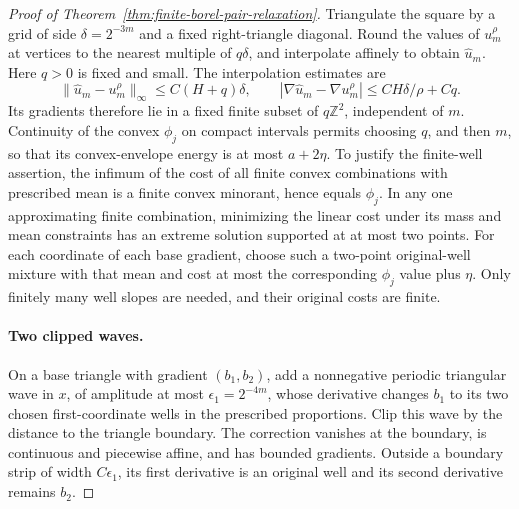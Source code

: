 \documentclass[11pt]{article}
\numberwithin{equation}{section}
\begin{document}
\begin{proof}[Proof of Theorem~\ref{thm:finite-borel-pair-relaxation}]
Triangulate the square by a grid of side $\delta=2^{-3m}$ and a
fixed right-triangle diagonal. Round the values of $u_m^\rho$ at
vertices to the nearest multiple of $q\delta$, and interpolate
affinely to obtain $\widehat u_m$. Here $q>0$ is fixed and small.
The interpolation estimates are
\[
 \|\widehat u_m-u_m^\rho\|_\infty\le C(H+q)\delta,
 \qquad
 |\nabla\widehat u_m-\nabla u_m^\rho|
                  \le CH\delta/\rho+Cq.
\]
Its gradients therefore lie in a fixed finite subset of
$q\mathbb Z^2$, independent of $m$. Continuity of the convex
$\phi_j$ on compact intervals permits choosing $q$, and then $m$,
so that its convex-envelope energy is at most $a+2\eta$.
To justify the finite-well assertion, the infimum of the cost of all
finite convex combinations with prescribed mean is a finite convex
minorant, hence equals $\phi_j$. In any one approximating finite
combination, minimizing the linear cost under its mass and mean
constraints has an extreme solution supported at at most two points.
For each coordinate of each base gradient, choose such a two-point
original-well mixture with that mean and cost at most the
corresponding $\phi_j$ value plus $\eta$. Only finitely many well
slopes are needed, and their original costs are finite.

\paragraph{Two clipped waves.}
On a base triangle with gradient $(b_1,b_2)$, add a nonnegative
periodic triangular wave in $x$, of amplitude at most
$\epsilon_1=2^{-4m}$, whose derivative changes $b_1$ to its two
chosen first-coordinate wells in the prescribed proportions.
Clip this wave by the distance to the triangle boundary. The
correction vanishes at the boundary, is continuous and piecewise
affine, and has bounded gradients. Outside a boundary strip of
width $C\epsilon_1$, its first derivative is an original well and
its second derivative remains $b_2$.


\end{proof}
\end{document}

